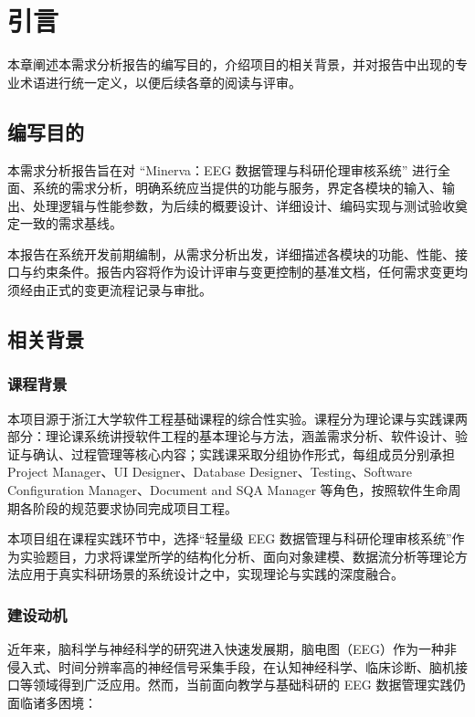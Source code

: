 \section{引言}

本章阐述本需求分析报告的编写目的，介绍项目的相关背景，并对报告中出现的专业术语进行统一定义，以便后续各章的阅读与评审。

\subsection{编写目的}

本需求分析报告旨在对 ``Minerva：EEG 数据管理与科研伦理审核系统'' 进行全面、系统的需求分析，明确系统应当提供的功能与服务，界定各模块的输入、输出、处理逻辑与性能参数，为后续的概要设计、详细设计、编码实现与测试验收奠定一致的需求基线。

本报告在系统开发前期编制，从需求分析出发，详细描述各模块的功能、性能、接口与约束条件。报告内容将作为设计评审与变更控制的基准文档，任何需求变更均须经由正式的变更流程记录与审批。

\subsection{相关背景}

\subsubsection{课程背景}

本项目源于浙江大学软件工程基础课程的综合性实验。课程分为理论课与实践课两部分：理论课系统讲授软件工程的基本理论与方法，涵盖需求分析、软件设计、验证与确认、过程管理等核心内容；实践课采取分组协作形式，每组成员分别承担 Project Manager、UI Designer、Database Designer、Testing、Software Configuration Manager、Document and SQA Manager 等角色，按照软件生命周期各阶段的规范要求协同完成项目工程。

本项目组在课程实践环节中，选择``轻量级 EEG 数据管理与科研伦理审核系统''作为实验题目，力求将课堂所学的结构化分析、面向对象建模、数据流分析等理论方法应用于真实科研场景的系统设计之中，实现理论与实践的深度融合。

\subsubsection{建设动机}

近年来，脑科学与神经科学的研究进入快速发展期，脑电图（EEG）作为一种非侵入式、时间分辨率高的神经信号采集手段，在认知神经科学、临床诊断、脑机接口等领域得到广泛应用。然而，当前面向教学与基础科研的 EEG 数据管理实践仍面临诸多困境：

